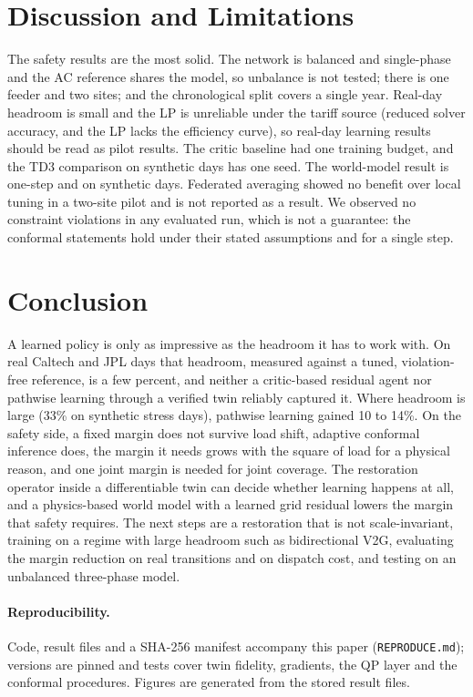 \documentclass[11pt]{article}
\begin{document}
\section{Discussion and Limitations}
The safety results are the most solid. The network is balanced and single-phase and the AC reference shares the model, so unbalance is not tested; there is one feeder and two sites; and the chronological split covers a single year. Real-day headroom is small and the LP is unreliable under the tariff source (reduced solver accuracy, and the LP lacks the efficiency curve), so real-day learning results should be read as pilot results. The critic baseline had one training budget, and the TD3 comparison on synthetic days has one seed. The world-model result is one-step and on synthetic days. Federated averaging showed no benefit over local tuning in a two-site pilot and is not reported as a result. We observed no constraint violations in any evaluated run, which is not a guarantee: the conformal statements hold under their stated assumptions and for a single step.

\section{Conclusion}
A learned policy is only as impressive as the headroom it has to work with. On real Caltech and JPL days that headroom, measured against a tuned, violation-free reference, is a few percent, and neither a critic-based residual agent nor pathwise learning through a verified twin reliably captured it. Where headroom is large (33\% on synthetic stress days), pathwise learning gained 10 to 14\%. On the safety side, a fixed margin does not survive load shift, adaptive conformal inference does, the margin it needs grows with the square of load for a physical reason, and one joint margin is needed for joint coverage. The restoration operator inside a differentiable twin can decide whether learning happens at all, and a physics-based world model with a learned grid residual lowers the margin that safety requires. The next steps are a restoration that is not scale-invariant, training on a regime with large headroom such as bidirectional V2G, evaluating the margin reduction on real transitions and on dispatch cost, and testing on an unbalanced three-phase model.

\paragraph{Reproducibility.} Code, result files and a SHA-256 manifest accompany this paper (\texttt{REPRODUCE.md}); versions are pinned and tests cover twin fidelity, gradients, the QP layer and the conformal procedures. Figures are generated from the stored result files.
\end{document}
